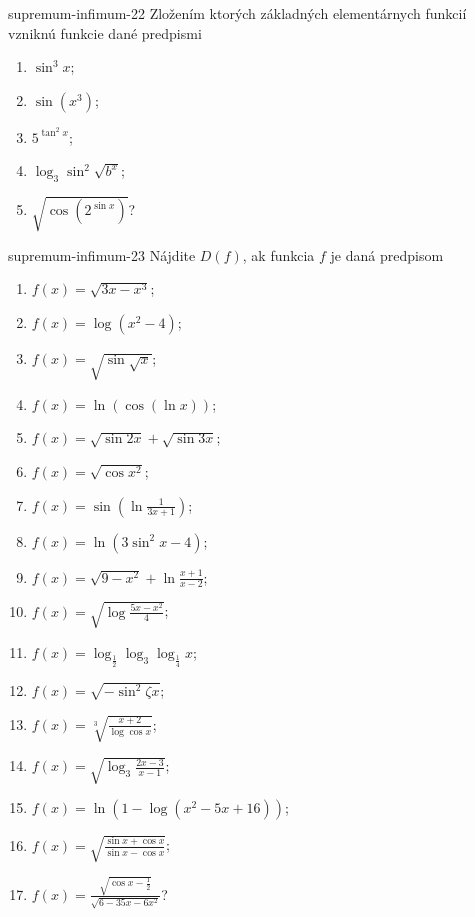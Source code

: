 \begin{defproblem}{supremum-infimum-22}
Zložením ktorých základných elementárnych funkcií vzniknú funkcie dané predpismi
\begin{multicols}{2}
\begin{enumerate}
    \item $\sin^3 x$;
    \item $\sin (x^3)$;
    \item $5^{\tan^2 x}$;
    \item $\log_3 \sin^2 \sqrt{b^x}$;
    \item $\sqrt{\cos (2^{\sin x})}$?
\end{enumerate}
\end{multicols}
\end{defproblem}

\begin{defproblem}{supremum-infimum-23}
Nájdite $D(f)$, ak funkcia $f$ je daná predpisom
\begin{multicols}{2}
\begin{enumerate}
    \item $f(x)=\sqrt{3x-x^3}$;
    \item $f(x)=\log(x^2-4)$;
    \item $f(x)=\sqrt{\sin \sqrt{x}}$;
    \item $f(x)=\ln (\cos (\ln x))$;
    \item $f(x)=\sqrt{\sin 2x}+\sqrt{\sin 3x}$;
    \item $f(x)=\sqrt{\cos x^2}$;
    \item $f(x)=\sin (\ln \frac{1}{3x+1})$;
    \item $f(x)=\ln (3\sin^2 x -4)$;
    \item $f(x)=\sqrt{9-x^2}+\ln \frac{x+1}{x-2}$;
    \item $f(x)=\sqrt{\log \frac{5x-x^2}{4}}$;
    \item $f(x)=\log_\frac{1}{2}\log_3 \log_\frac{1}{4} x$;
    \item $f(x)=\sqrt{-\sin^2 \zeta x}$;
    \item $f(x)=\sqrt[3]{\frac{x+2}{\log\cos x}}$;
    \item $f(x)=\sqrt{\log_3 \frac{2x-3}{x-1}}$;
    \item $f(x)=\ln (1-\log (x^2-5x+16))$;
    \item $f(x)=\sqrt{\frac{\sin x +\cos x}{\sin x -\cos x}}$;
    \item $f(x)=\frac{\sqrt{\cos x -\frac{1}{2}}}{\sqrt{6-35x-6x^2}}$?
\end{enumerate}
\end{multicols}
\end{defproblem}

